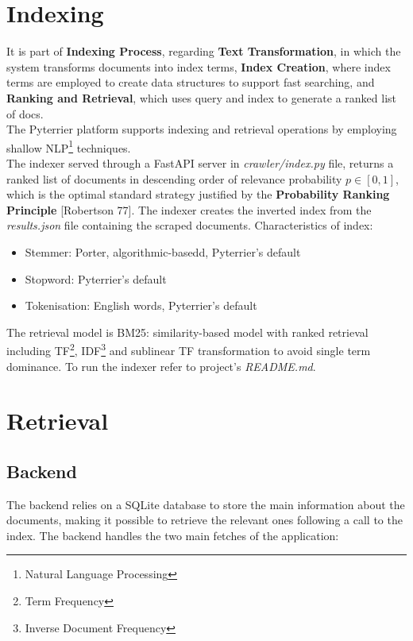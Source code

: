 \documentclass[12pt]{spieman}  %
\begin{document}
\begin{spacing}{1}
    \section{Indexing}\label{sec:indexing}
    It is part of \textbf{Indexing Process},
    regarding \textbf{Text Transformation}, in which the system transforms documents into index terms,
    \textbf{Index Creation}, where index terms are employed to create data structures to support fast searching,
    and \textbf{Ranking and Retrieval}, which uses query and index to generate a ranked list of docs.\\
    The Pyterrier platform supports indexing and retrieval operations by employing shallow
    NLP\footnote{Natural Language Processing}
    techniques.\\
    The indexer served through a FastAPI server in \textit{crawler/index.py} file,
    returns a ranked list of documents in descending order of relevance probability $p \in [0,1]$,
    which is the optimal standard strategy justified by the
    \textbf{Probability Ranking Principle} [Robertson 77].
    The indexer creates the inverted index from the \textit{results.json} file containing the scraped documents.
    Characteristics of index:
    \vspace{-0.1cm}
    \begin{itemize}
        \setlength\itemsep{0.1em}
        \item Stemmer: Porter, algorithmic-basedd, Pyterrier's default
        \item Stopword: Pyterrier's default
        \item Tokenisation: English words, Pyterrier's default
    \end{itemize}

    The retrieval model is BM25: similarity-based model with ranked retrieval including
    TF\footnote{Term Frequency},
    IDF\footnote{Inverse Document Frequency}
    and sublinear TF transformation to avoid single term dominance.
    To run the indexer refer to project's \textit{README.md}.

    \section{Retrieval}

    \subsection{Backend}\label{sec:backend}
    The backend relies on a SQLite database to store the main information about the documents,
    making it possible to retrieve the relevant ones following a call to the index.\newline
    The backend handles the two main fetches of the application:


\end{spacing}
\end{document}

